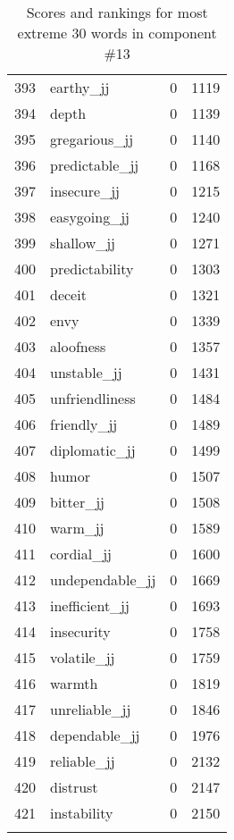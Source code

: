 \begin{longtable}[!htbp]{| rlr@{.}l |}
    393 & earthy\_jj & 0 & 1119 \\
    394 & depth & 0 & 1139 \\
    395 & gregarious\_jj & 0 & 1140 \\
    396 & predictable\_jj & 0 & 1168 \\
    397 & insecure\_jj & 0 & 1215 \\
    398 & easygoing\_jj & 0 & 1240 \\
    399 & shallow\_jj & 0 & 1271 \\
    400 & predictability & 0 & 1303 \\
    401 & deceit & 0 & 1321 \\
    402 & envy & 0 & 1339 \\
    403 & aloofness & 0 & 1357 \\
    404 & unstable\_jj & 0 & 1431 \\
    405 & unfriendliness & 0 & 1484 \\
    406 & friendly\_jj & 0 & 1489 \\
    407 & diplomatic\_jj & 0 & 1499 \\
    408 & humor & 0 & 1507 \\
    409 & bitter\_jj & 0 & 1508 \\
    410 & warm\_jj & 0 & 1589 \\
    411 & cordial\_jj & 0 & 1600 \\
    412 & undependable\_jj & 0 & 1669 \\
    413 & inefficient\_jj & 0 & 1693 \\
    414 & insecurity & 0 & 1758 \\
    415 & volatile\_jj & 0 & 1759 \\
    416 & warmth & 0 & 1819 \\
    417 & unreliable\_jj & 0 & 1846 \\
    418 & dependable\_jj & 0 & 1976 \\
    419 & reliable\_jj & 0 & 2132 \\
    420 & distrust & 0 & 2147 \\
    421 & instability & 0 & 2150 \\
    \hline
    \caption{Scores and rankings for most extreme 30 words in component \#13} \\
\end{longtable}
